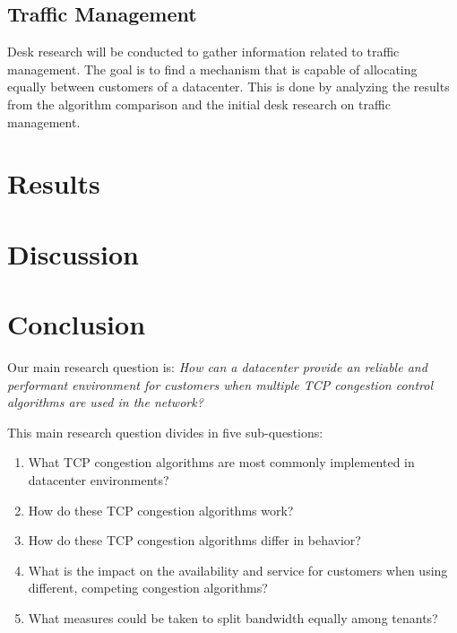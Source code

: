\documentclass{article}
\begin{document}
	\subsection{Traffic Management}
	Desk research will be conducted to gather information related to traffic management. The goal is to find a mechanism that is capable of allocating equally between customers of a datacenter. This is done by analyzing the results from the algorithm comparison and the initial desk research on traffic management. 

\section{Results}


\section{Discussion}


\section{Conclusion}


Our main research question is:
{\it How can a datacenter provide an reliable and performant environment for
customers when multiple TCP congestion control algorithms are used in the
network?}

\vspace{0.5cm}

This main research question divides in five sub-questions:

\begin{enumerate}
	\item What TCP congestion algorithms are most commonly implemented in datacenter environments?
	\item How do these TCP congestion algorithms work?
	\item How do these TCP congestion algorithms differ in behavior?
	\item What is the impact on the availability and service for customers when using different, competing congestion algorithms?
	\item What measures could be taken to split bandwidth equally among tenants?
\end{enumerate}


\end{document}
